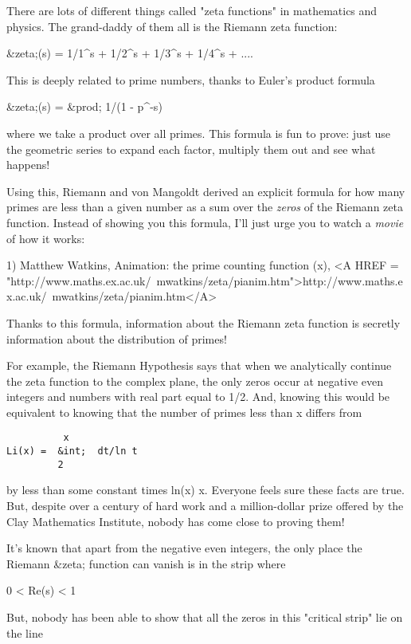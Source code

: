 


There are lots of different things called "zeta functions" 
in mathematics 
and physics.  The grand-daddy of them all is the Riemann zeta function:

&zeta;(s) = 1/1^{s} + 1/2^{s} + 1/3^{s} + 1/4^{s} + ....

This is deeply related to prime numbers, thanks to Euler's product formula

&zeta;(s) = &prod; 1/(1 - p^{-s})

where we take a product over all primes.  This formula is fun to prove: 
just use the geometric series to expand each factor, multiply them out 
and see what happens!

Using this, Riemann and von Mangoldt derived an explicit formula 
for how many primes are less than a given number as a sum over the 
\emph{zeros} of the Riemann zeta function.   Instead of showing you 
this formula, I'll just urge you to watch a \emph{movie} of how it works:

1) Matthew Watkins, Animation: the prime counting function
\pi (x), <A HREF = "http://www.maths.ex.ac.uk/~mwatkins/zeta/pianim.htm">http://www.maths.ex.ac.uk/~mwatkins/zeta/pianim.htm</A>  

Thanks to this formula, information about the Riemann zeta function 
is secretly information about the distribution of primes!  

For example, the Riemann Hypothesis says that when we analytically 
continue the zeta function to the complex plane, the only zeros occur 
at negative even integers and numbers with real part equal to 1/2.
And, knowing this would be equivalent to knowing that the number of 
primes less than x differs from
\begin{verbatim}
          x
Li(x) =  &int;  dt/ln t  
         2
\end{verbatim}
    
by less than some constant times ln(x) \sqrt x.  
Everyone feels
sure these facts are true.  But, despite over a century of hard work 
and a million-dollar prize offered by the Clay Mathematics Institute,
nobody has come close to proving them!

It's known that apart from the negative even integers, the only 
place the Riemann &zeta; function can vanish is in the strip where

0 < Re(s) < 1

But, nobody has been able to show that all the zeros in this 
"critical strip" lie on the line 

